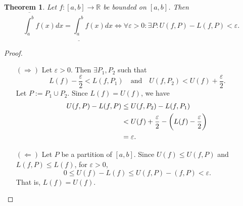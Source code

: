 \documentclass[12pt,openany]{book}
\newtheorem{theorem}{Theorem}[chapter]
\theoremstyle{definition}
\newcommand{\R}{\mathbb{R}}
\newcommand{\upRiemannint}[2]{
	\overline{\int_{#1}^{#2}}
}
\newcommand{\loRiemannint}[2]{
	\underline{\int_{#1}^{#2}}
}
\begin{document}
	\newpage
	\begin{tcolorbox}[colframe=thmcolor, title={\color{white}\bf $\star$ Riemann's Condition $\star$}]
		\begin{theorem}
			Let \(f:[a,b]\to\R\) be bounded on \([a,b]\). Then \[
			\upRiemannint{a}{b}f(x)dx=\loRiemannint{a}{b}f(x)dx\iff \forall\varepsilon>0:\exists P: U(f,P)-L(f,P)<\varepsilon.
			\]
		\end{theorem}
	\end{tcolorbox}
	\begin{proof}
		\begin{itemize}
			\item[\((\Rightarrow)\)] 
			Let \(\varepsilon>0\). Then \(\exists P_1,P_2\) such that \[
			L(f)-\frac{\varepsilon}{2}<L(f,P_1)\quad\text{and}\quad U(f,P_2)<U(f)+\frac{\varepsilon}{2}.
			\] Let \(P:=P_1\cup P_2\). Since \(L(f)=U(f)\), we have \begin{align*}
				U(f,P)-L(f,P)&\leq U(f,P_2)-L(f,P_1)\\
				&<U(f)+\frac{\varepsilon}{2}-\del{L(f)-\frac{\varepsilon}{2}}\\
				&=\varepsilon.
			\end{align*}
			\item[\((\Leftarrow)\)] Let \(P\) be a partition of \([a,b]\). Since \(U(f)\leq U(f,P)\) and \(L(f,P)\leq L(f)\), for \(\varepsilon>0\), \[
			0\leq U(f)-L(f)\leq U(f,P)-(f,P)<\varepsilon.
			\] That is, \(L(f)=U(f)\).
		\end{itemize}
	\end{proof}
	
\end{document}
